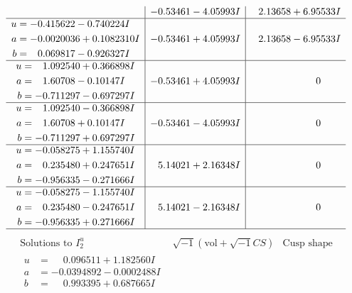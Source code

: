 \documentclass[1p]{elsarticle_modified}
\theoremstyle{definition}
\newcommand{\I}{\sqrt{-1}}
\begin{document}
$$\begin{array}{c|c|c}
 & -0.53461 - 4.05993 I & \phantom{-}2.13658 + 6.95533 I \\ \hline\begin{aligned}
u &= -0.415622 - 0.740224 I \\
a &= -0.0020036 + 0.1082310 I \\
b &= \phantom{-}0.069817 - 0.926327 I\end{aligned}
 & -0.53461 + 4.05993 I & \phantom{-}2.13658 - 6.95533 I \\ \hline\begin{aligned}
u &= \phantom{-}1.092540 + 0.366898 I \\
a &= \phantom{-}1.60708 - 0.10147 I \\
b &= -0.711297 - 0.697297 I\end{aligned}
 & -0.53461 + 4.05993 I & \phantom{-0.000000 } 0 \\ \hline\begin{aligned}
u &= \phantom{-}1.092540 - 0.366898 I \\
a &= \phantom{-}1.60708 + 0.10147 I \\
b &= -0.711297 + 0.697297 I\end{aligned}
 & -0.53461 - 4.05993 I & \phantom{-0.000000 } 0 \\ \hline\begin{aligned}
u &= -0.058275 + 1.155740 I \\
a &= \phantom{-}0.235480 + 0.247651 I \\
b &= -0.956335 - 0.271666 I\end{aligned}
 & \phantom{-}5.14021 + 2.16348 I & \phantom{-0.000000 } 0 \\ \hline\begin{aligned}
u &= -0.058275 - 1.155740 I \\
a &= \phantom{-}0.235480 - 0.247651 I \\
b &= -0.956335 + 0.271666 I\end{aligned}
 & \phantom{-}5.14021 - 2.16348 I & \phantom{-0.000000 } 0\\
 \hline 
 \end{array}$$\newpage$$\begin{array}{c|c|c}  
\text{Solutions to }I^u_{2}& \I (\text{vol} + \sqrt{-1}CS) & \text{Cusp shape}\\
 \hline 
\begin{aligned}
u &= \phantom{-}0.096511 + 1.182560 I \\
a &= -0.0394892 - 0.0002488 I \\
b &= \phantom{-}0.993395 + 0.687665 I\end{aligned}

\end{array}$$
\end{document}
